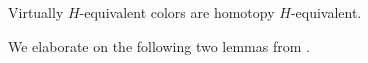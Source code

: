 \documentclass[a4paper,10pt
,draft
]{article}%
\newcommand{\J}{\mathbb J}
\renewcommand{\1}{\ensuremath{\mathbb{id}}}
\begin{document}


\begin{lemma}
      \label{VIR_HTPY_LEM}
      Virtually $H$-equivalent colors are homotopy $H$-equivalent. 
\end{lemma}

We elaborate on the following two lemmas from \cite{BM13}.
\end{document}

